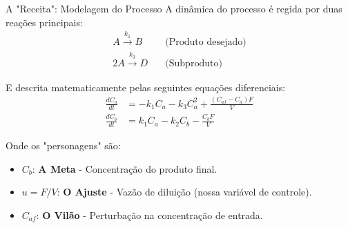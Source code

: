 \documentclass{beamer}
\begin{document}
\begin{frame}{A "Receita": Modelagem do Processo}
    \Large A dinâmica do processo é regida por duas reações principais:
    \begin{align*}
        A \xrightarrow{k_1} B \quad & \text{(Produto desejado)} \\
        2A \xrightarrow{k_3} D \quad & \text{(Subproduto)}
    \end{align*}
    
    \vspace{1em}
    \normalsize E descrita matematicamente pelas seguintes equações diferenciais:
    \begin{align*}
    \frac{dC_a}{dt} &= -k_1 C_a - k_3 C_a^2 + \frac{(C_{af} - C_a) F}{V} \\
    \frac{dC_b}{dt} &= k_1 C_a - k_2 C_b - \frac{C_b F}{V}
    \end{align*}
    
    \vspace{1em}
    \large Onde os "personagens" são:
    \begin{itemize}
        \item \(C_b\): \textbf{A Meta} - Concentração do produto final.
        \item \(u = F/V\): \textbf{O Ajuste} - Vazão de diluição (nossa variável de controle).
        \item \(C_{af}\): \textbf{O Vilão} - Perturbação na concentração de entrada.
    \end{itemize}
\end{frame}
\end{document}
